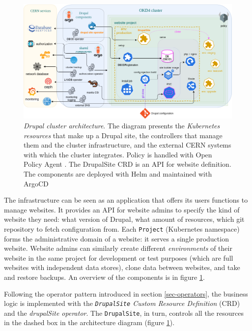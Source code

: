 \begin{figure}[t]
    \centering
    \includegraphics[width=.95\textwidth]{figures/drupal-architecture}
    \vspace{-1em}
    \caption{\emph{Drupal cluster architecture}.
    The diagram presents the \emph{Kubernetes resources} that {\color{darkseagreen} make up a Drupal site},
    the {\color{carolinablue} controllers} that manage them and the cluster infrastructure,
    and the {\color{beige} external CERN systems} with which the cluster integrates.
    Policy is handled with Open Policy Agent \cite{openPolicyAgent}.
    The {\color{fluorescentorange} DrupalSite CRD} is an API for website definition.
    The components are deployed with Helm \cite{helmsh} and maintained with ArgoCD \cite{argocd}}
    \label{fig:drupal-architecture}
    \vspace{-2em}
\end{figure}

The infrastructure can be seen as an application that offers its users functions to manage websites.
It provides an API for website admins to specify the kind of website they need: what version of Drupal, what amount of resources, which git repository to fetch configuration from.
Each \texttt{Project} (Kubernetes namespace) forms the administrative domain of a website: it serves a single production website.
Website admins can similarly create different \emph{environments} of their website in the same project for development or test purposes (which are full websites with independent data stores),
clone data between websites, and take and restore backups.
An overview of the components is in figure \ref{fig:drupal-architecture}.

Following the operator pattern introduced in section \ref{sec-operators}, the business logic is implemented with the \emph{\texttt{DrupalSite} Custom Resource Definition} (CRD) and the \emph{drupalSite operator}.
The \texttt{DrupalSite}, in turn, controls all the resources in the { \color{fluorescentorange} dashed box } in the architecture diagram (figure \ref{fig:drupal-architecture}).

